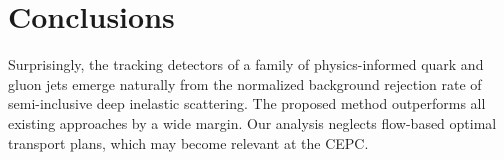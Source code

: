 \section{Conclusions}\label{sec:conclusions}

Surprisingly, the tracking detectors of a family of physics-informed
quark and gluon jets emerge naturally from the normalized background
rejection rate of semi-inclusive deep inelastic scattering. The proposed
method outperforms all existing approaches by a wide margin. Our
analysis neglects flow-based optimal transport plans, which may become
relevant at the CEPC.

